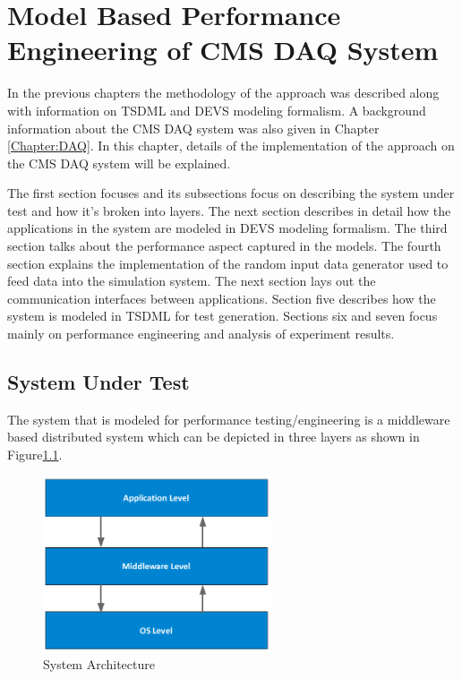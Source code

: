 \chapter{Model Based Performance Engineering of CMS DAQ System}
\label{Chapter:Implementation}

In the previous chapters the methodology of the approach was described along with information on TSDML and DEVS modeling formalism. A background information about the CMS DAQ system was also given in Chapter \ref{Chapter:DAQ}. In this chapter, details of the implementation of the approach on the CMS DAQ system will be explained. 

The first section focuses and its subsections focus on describing the system under test and how it's broken into layers. The next section describes in detail how the applications in the system are modeled in DEVS modeling formalism. The third section talks about the performance aspect captured in the models. The fourth section explains the implementation of the random input data generator used to feed data into the simulation system. The next section lays out the communication interfaces between applications. Section five describes how the system is modeled in TSDML for test generation. Sections six and seven focus mainly on performance engineering and analysis of experiment results.   

\section{System Under Test}
The system that is modeled for performance testing/engineering is a middleware based distributed system which can be depicted in three layers as shown in Figure\ref{fig:systemfigure}.

\begin{figure}
 \centering
 \includegraphics[width=0.6\textwidth]{figures/SystemFigure.png}
 \caption{System Architecture}
 \label{fig:systemfigure}
\end{figure}

